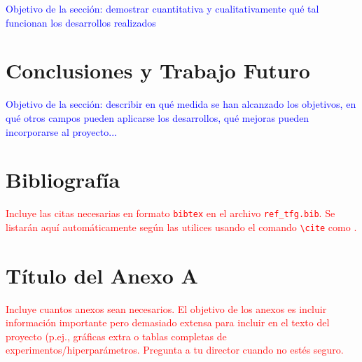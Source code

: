 \documentclass[12pt]{extarticle}
\numberwithin{equation}{section}
\begin{document}
\begin{refsection}
\textcolor{blue}{Objetivo de la secci\'on: demostrar cuantitativa y cualitativamente qu\'e tal funcionan los desarrollos realizados}

\newpage

\section{Conclusiones y Trabajo Futuro}\label{sec:conclusion}
\textcolor{blue}{Objetivo de la secci\'on: describir en qu\'e medida se han alcanzado los objetivos, en qu\'e otros campos pueden aplicarse los desarrollos, qu\'e mejoras pueden incorporarse al proyecto...}

\newpage

\section{Bibliograf\'ia} \label{sec:bibliography}
\textcolor{red}{Incluye las citas necesarias en formato \texttt{bibtex} en el archivo \texttt{ref\_tfg.bib}. Se listar\'an aqu\'i autom\'aticamente seg\'un las utilices usando el comando \texttt{\textbackslash cite} como \cite{einstein1905}.} 

\printbibliography[heading=none]

\end{refsection}
\newpage

\appendix
\section{T\'itulo del Anexo A}
\textcolor{red}{Incluye cuantos anexos sean necesarios. El objetivo de los anexos es incluir informaci\'on importante pero demasiado extensa para incluir en el texto del proyecto (p.ej., gr\'aficas extra o tablas completas de experimentos/hiperpar\'ametros. Pregunta a tu director cuando no est\'es seguro.}
\end{document}
